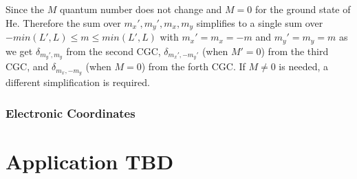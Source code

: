 Since the $M$ quantum number does not change and $M=0$ for the ground state of He. Therefore the sum over $m_x',m_y',m_x,m_y$ simplifies to a single sum over $-min(L',L)\le m \le min(L',L)$ with $m_x'=m_x=-m$ and $m_y'=m_y=m$ as we get $\delta_{m_y',m_y}$ from the second CGC, $\delta_{m_x',-m_y'}$ (when $M'=0$) from the third CGC, and $\delta_{m_x,-m_y}$ (when $M=0$) from the forth CGC. If $M\ne0$ is needed, a different simplification is required.


\subsubsection{Electronic Coordinates} %
\label{ssub:electronic_coordinates}


\section{Application TBD} %
\label{sec:application_tbd}

